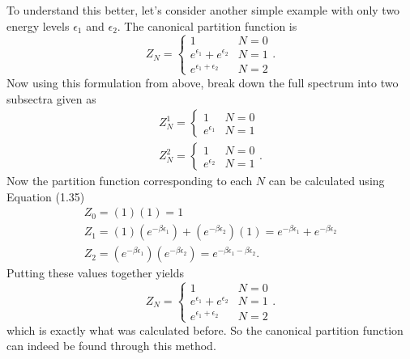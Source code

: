 To understand this better, let's consider another simple example with only two energy levels $\epsilon_1$ and $\epsilon_2$. The canonical partition function is 
\begin{equation}
    Z_N = \begin{cases}
    1 & N=0\\
    e^{\epsilon_1}+e^{\epsilon_2} & N=1\\
    e^{\epsilon_1+\epsilon_2} & N=2
    \end{cases}.
\end{equation}
Now using this formulation from above, break down the full spectrum into two subsectra given as 
\begin{gather}
    Z_N^1=\begin{cases}1&N=0\\e^{\epsilon_1}& N=1\end{cases}\\
    Z_N^2=\begin{cases}1&N=0\\e^{\epsilon_2}& N=1\end{cases}.
\end{gather}
Now the partition function corresponding to each $N$ can be calculated using Equation (1.35)  
\begin{gather}
    Z_0= (1)(1)=1\\
    Z_1= (1)(e^{-\beta\epsilon_1})+(e^{-\beta\epsilon_2})(1)=e^{-\beta\epsilon_1}+e^{-\beta\epsilon_2}\\
    Z_2=(e^{-\beta\epsilon_1})(e^{-\beta\epsilon_2})=e^{-\beta\epsilon_1-\beta\epsilon_2}.
\end{gather}
Putting these values together yields 
\begin{equation}
    Z_N = \begin{cases}
    1 & N=0\\
    e^{\epsilon_1}+e^{\epsilon_2} & N=1\\
    e^{\epsilon_1+\epsilon_2} & N=2
    \end{cases}.
\end{equation}
which is exactly what was calculated before. So the canonical partition function can indeed be found through this method.